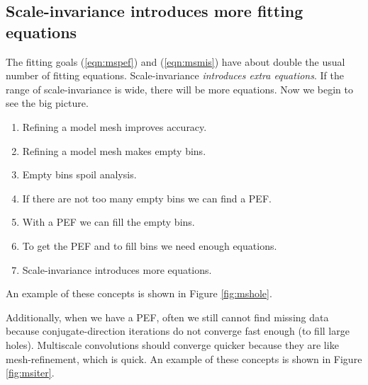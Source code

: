 \subsection{Scale-invariance introduces more fitting equations}
The fitting goals (\ref{eqn:mspef}) and (\ref{eqn:msmis}) have
about double the usual number of fitting equations.
Scale-invariance {\it introduces extra equations}.
If the range of scale-invariance is wide, there will be more equations.
Now we begin to see the big picture.
\begin{enumerate}
\item Refining a model mesh improves accuracy.
\item Refining a model mesh makes empty bins.
\item Empty bins spoil analysis.
\item If there are not too many empty bins we can find a PEF.
\item With a PEF we can fill the empty bins.
\item To get the PEF and to fill bins we need enough equations.
\item Scale-invariance introduces more equations.
\end{enumerate}
An example of these concepts is shown in Figure \ref{fig:mshole}.

Additionally, when we have a PEF,
often we still cannot find missing data
because conjugate-direction iterations do not converge fast enough
(to fill large holes).
Multiscale convolutions should converge quicker
because they are like mesh-refinement, which is quick.
An example of these concepts is shown in Figure \ref{fig:msiter}.

